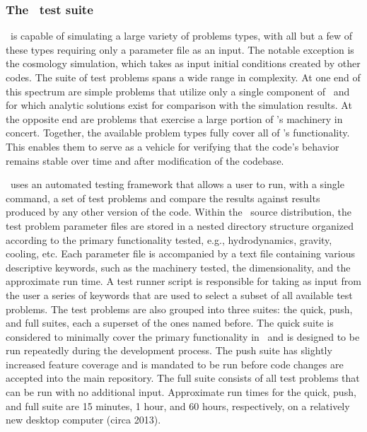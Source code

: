 \subsubsection{The \enzo\ test suite}
\label{sec.tests.suite}

\enzo\ is capable of simulating a large variety of problems types,
with all but a few of these types requiring only a parameter file as an
input.  The notable exception is the cosmology simulation, which takes
as input initial conditions created by other codes.  The suite of test
problems spans a wide range in complexity.  At one end of this spectrum
are simple problems that utilize only a single component of \enzo\ and
for which analytic solutions exist for comparison with the simulation
results.  At the opposite end are problems that exercise a large
portion of \enzo's machinery in concert.  Together, the available
problem types fully cover all of \enzo's functionality.  This enables
them to serve as a vehicle for verifying that the code's behavior
remains stable over time and after modification of the codebase.

\enzo\ uses an automated testing framework that allows a user to run,
with a single command, a set of test problems and compare the results
against results produced by any other version of the code.  Within the
\enzo\ source distribution, the test problem parameter files are stored
in a nested directory structure organized according to the primary
functionality tested, e.g., hydrodynamics, gravity, cooling, etc.
Each parameter file is accompanied by a text file containing various
descriptive keywords, such as the machinery tested, the
dimensionality, and the approximate run time.  A test runner script is
responsible for taking as input from the user a series of keywords
that are used to select a subset of all available test problems.  The
test problems are also grouped into three suites: the quick, push, and
full suites, each a superset of the ones named before.  The quick
suite is considered to minimally cover the primary functionality in
\enzo\ and is designed to be run repeatedly during the development
process.  The push suite has slightly increased feature coverage and
is mandated to be run before code changes are accepted into the main
repository.  The full suite consists of all test problems that can be
run with no additional input.  Approximate run times for the quick,
push, and full suite are 15 minutes, 1 hour, and 60 hours,
respectively, on a relatively new desktop computer (circa 2013).

